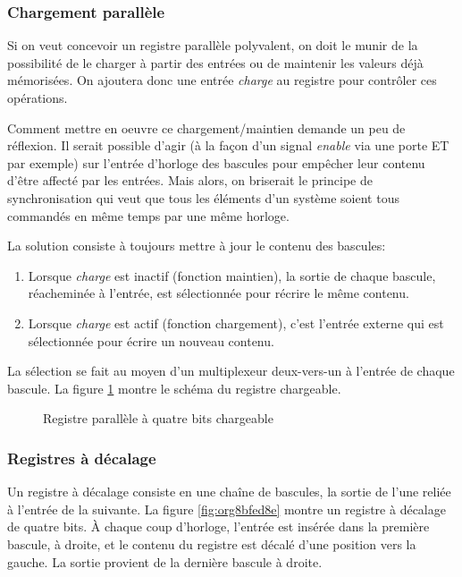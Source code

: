 \documentclass[11pt]{article}
\begin{document}
\subsubsection{Chargement parallèle}
\label{sec:org95efa0e}

Si on veut concevoir un registre parallèle polyvalent, on doit le
munir de la possibilité de le charger à partir des entrées ou de
maintenir les valeurs déjà mémorisées. On ajoutera donc une entrée
\emph{charge} au registre pour contrôler ces opérations.

Comment mettre en oeuvre ce chargement/maintien demande un peu de
réflexion. Il serait possible d'agir (à la façon d'un signal \emph{enable}
via une porte ET par exemple) sur l'entrée d'horloge des bascules
pour empêcher leur contenu d'être affecté par les entrées. Mais
alors, on briserait le principe de synchronisation qui veut que tous
les éléments d'un système soient tous commandés en même temps par une
même horloge.

La solution consiste à toujours mettre à jour le contenu des bascules: 

\begin{enumerate}
\item Lorsque \emph{charge} est inactif (fonction maintien), la sortie de
chaque bascule, réacheminée à l'entrée, est sélectionnée pour
récrire le même contenu.
\item Lorsque \emph{charge} est actif (fonction chargement), c'est l'entrée
externe qui est sélectionnée pour écrire un nouveau contenu.
\end{enumerate}

La sélection se fait au moyen d'un multiplexeur deux-vers-un à
l'entrée de chaque bascule. La figure \ref{fig:org055be0c} montre le schéma
du registre chargeable.

\begin{figure}[htbp]
\centering

\caption{\label{fig:org055be0c}Registre parallèle à quatre bits chargeable}
\end{figure}

\subsubsection{Registres à décalage}
\label{sec:org55dfb92}

Un registre à décalage consiste en une chaîne de bascules, la sortie
de l'une reliée à l'entrée de la suivante. La figure \ref{fig:org8bfed8e} montre
un registre à décalage de quatre bits. À chaque coup d'horloge,
l'entrée est insérée dans la première bascule, à droite, et le contenu
du registre est décalé d'une position vers la gauche. La sortie
provient de la dernière bascule à droite.
\end{document}
